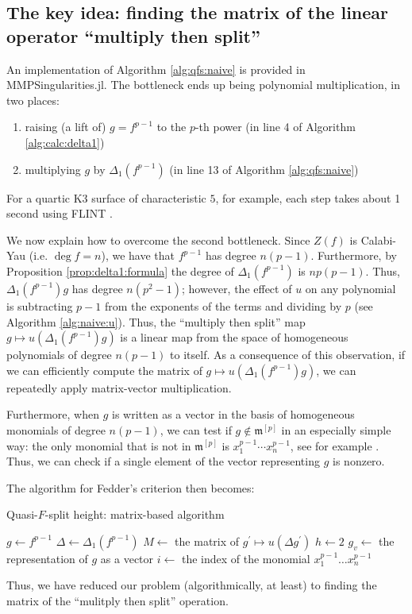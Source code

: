 \subsection{The key idea: finding the matrix of the linear operator ``multiply then split''}

An implementation of Algorithm \ref{alg:qfs:naive}
is provided in MMPSingularities.jl.
The bottleneck ends up being polynomial multiplication, 
in two places:
\begin{enumerate}[(1)]
    \item raising (a lift of) \(g = f^{p-1}\) to the \(p\)-th power 
        (in line 4 of Algorithm \ref{alg:calc:delta1})
    \item multiplying \(g\) by \(\Delta_{1}(f^{p-1})\) 
        (in line 13 of Algorithm \ref{alg:qfs:naive})
\end{enumerate}

\noindent For a quartic K3 surface of characteristic \(5\),
for example, each step takes about 1 second 
using FLINT \cite{flint-2023-flint}. 

We now explain how to overcome the second
bottleneck. Since \(Z(f)\) is Calabi-Yau
(i.e. \(\deg f = n\)), we have that \(f^{p-1}\) has degree
\(n(p-1)\). 
Furthermore, by Proposition \ref{prop:delta1:formula}
the degree of \(\Delta_{1}(f^{p-1})\) 
is \(np(p - 1)\).
Thus, \(\Delta_{1}(f^{p-1})g\) has degree
\(n(p^{2} - 1)\); however, the effect 
of \(u\) on any polynomial is subtracting \(p-1\)
from the exponents of the terms and dividing by \(p\) 
(see Algorithm \ref{alg:naive:u}).
Thus, the ``multiply then split'' map 
\(g \mapsto u(\Delta_{1}(f^{p-1}) g)\) 
is a linear map from 
the space of homogeneous polynomials of degree \(n(p-1)\) 
to itself.
As a consequence of this observation,
if we can efficiently compute the matrix of 
\(g \mapsto u(\Delta_{1}(f^{p-1})g)\),
we can repeatedly apply matrix-vector multiplication.

Furthermore, when \(g\) is written as a vector 
in the basis of homogeneous monomials of degree
\(n(p-1)\), we can test if \(g \notin \mathfrak{m}^{[p]}\) 
in an especially simple way: the only 
monomial that is not in \(\mathfrak{m}^{[p]}\) is
\(x_{1}^{p-1}\cdots x_{n}^{p-1}\), 
see for example \cite{kty-2022-fedder}.
Thus, we can check if a single element of the vector representing
\(g\) is nonzero.

The algorithm for Fedder's criterion then becomes:

\begin{algorithm}[H]
\caption{Quasi-\(F\)-split height: matrix-based algorithm}
\label{alg:qfs:matrix}
$g \gets f^{p - 1}$\;
$\Delta \gets \Delta_1(f^{p - 1})$\;
$M \gets $ the matrix of $g^{\prime} \mapsto u(\Delta g^{\prime})$\;
$h \gets 2$\;
$g_v \gets $ the representation of $g$ as a vector\;
$i \gets $ the index of the monomial $x_{1}^{p - 1} \dots x_{n}^{p - 1}$\;
\end{algorithm}

Thus, we have reduced our problem (algorithmically, at least)
to finding the matrix of the ``mulitply then split'' operation.
